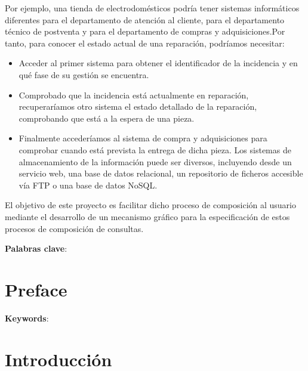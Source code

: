 \documentclass[a4paper,12pt]{article}
\begin{document}
	Por ejemplo, una tienda de electrodomésticos podría tener sistemas informáticos diferentes para el departamento de atención al cliente, para el departamento técnico de postventa y para el departamento de compras y adquisiciones.Por tanto, para conocer el estado actual de una reparación, podríamos necesitar:
		\begin{itemize}
			\item  Acceder al primer sistema para obtener el identificador de la incidencia y en qué fase de su gestión se encuentra.
			\item  Comprobado que la incidencia está actualmente en reparación, recuperaríamos otro sistema el estado detallado de la reparación, comprobando que está a la espera de una pieza.
			\item Finalmente accederíamos al sistema de compra y adquisiciones para comprobar cuando está prevista la entrega de dicha pieza. Los sistemas de almacenamiento de la información puede ser diversos, incluyendo desde un servicio web, una base de datos relacional, un repositorio de ficheros accesible vía FTP o una base de datos NoSQL.
		\end{itemize}
	
	\vspace{5mm}
	
	El objetivo de este proyecto es facilitar dicho proceso de composición al usuario mediante el desarrollo de un mecanismo gráfico para la especificación de estos procesos de composición de consultas.
	

	\vspace{5mm}
	
	\textbf{Palabras clave}: 
	\cleardoublepage
	
	\afterpage{\null\newpage}
	\newpage
	
	\section*{Preface}

	

	\textbf{Keywords}:
	\cleardoublepage
	
	\setcounter{page}{1}
	
	\afterpage{\null\newpage}
	\newpage
	
	\section{Introducción}
	
	
	
\end{document}
